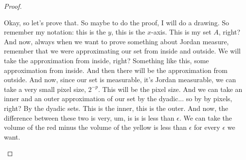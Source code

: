 \begin{proof}
\begin{spoken-clean}[00:03:20 - 00:04:31]
Okay, so let's prove that. So maybe to do the proof, I will do a drawing. So remember my notation: this is the $y$, this is the $x$-axis. This is my set $A$, right? And now, always when we want to prove something about Jordan measure, remember that we were approximating our set from inside and outside. We will take the approximation from inside, right? Something like this, some approximation from inside. And then there will be the approximation from outside. And now, since our set is measurable, it's Jordan measurable, we can take a very small pixel size, $2^{-p}$. This will be the pixel size. And we can take an inner and an outer approximation of our set by the dyadic... so by by pixels, right? By the dyadic sets. This is the inner, this is the outer. And now, the difference between these two is very, um, is is is less than $\epsilon$. We can take the volume of the red minus the volume of the yellow is less than $\epsilon$ for every $\epsilon$ we want.
\end{spoken-clean}

\begin{math-stroke}
\begin{center}
\end{center}
\end{math-stroke}
\end{proof}

